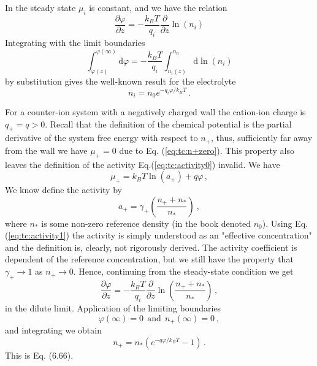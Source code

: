 \documentclass[11pt]{article}
\renewcommand{\d}{\mathrm{d}}
\begin{document}
In the steady state $\mu_i$ is constant, and we have the relation 
\begin{equation}
	\frac{\partial \varphi}{\partial z} = -\frac{k_BT}{q_i}\frac{\partial}{\partial z} \ln (n_i)
\end{equation}
Integrating with the limit boundaries 
\begin{equation}
	\int_{\varphi(z)}^{\varphi(\infty)} \d \varphi = -\frac{k_BT}{q_i} \int_{n_i(z)}^{n_0} \d 
\ln(n_i)
\end{equation}
by substitution gives the well-known result for the electrolyte 
\begin{equation}
	n_i = n_0e^{-q_i\varphi/k_BT} \, .
\end{equation}

For a counter-ion system with a negatively charged wall the cation-ion charge is  $q_+ = q > 0$. Recall 
that the definition of the chemical potential is the partial derivative of the system free energy 
with respect to $n_+$, thus, sufficiently far away from the wall we have $\mu_+ = 0$ due to  Eq. (\ref{eq:tc:n+zero}). 
This property also leaves the definition of the activity Eq.(\ref{eq:tc:activity0}) invalid. We have 
\begin{equation}
	\mu_+ = k_BT \ln(a_+) + q\varphi \, ,
\end{equation}
We know define the activity by
\begin{equation}
	\label{eq:tc:activity1}
	a_+ = \gamma_+ \left(\frac{n_+ + n_*}{n_*} \right)\ ,
\end{equation}
where $n_*$ is some non-zero reference density (in the book denoted $n_0$). Using Eq. 
(\ref{eq:tc:activity1}) the activity is simply understood as an "effective 
concentration" and the definition is, clearly, not rigorously derived. The activity coefficient is 
dependent of the reference concentration, but we still have the property that 
$\gamma_+ \rightarrow 1$ as $n_+ \rightarrow 0$. Hence, continuing from the steady-state condition we get 
\begin{equation}
	\frac{\partial \varphi}{\partial z} = -\frac{k_BT}{q_i}\frac{\partial}{\partial z} \ln 
	\left( \frac{n_+ + n_*}{n_*} \right) \, ,
\end{equation}	
in the dilute limit. Application of the limiting boundaries 
\begin{equation}
	\varphi(\infty) = 0 \ \ \text{and} \ \ n_+(\infty) = 0 \ ,
\end{equation}
and integrating we obtain
\begin{equation}
	n_+ = n_*(e^{-q\varphi/k_BT} -1) \, .
\end{equation}
This is Eq. (6.66). 

\end{document}
